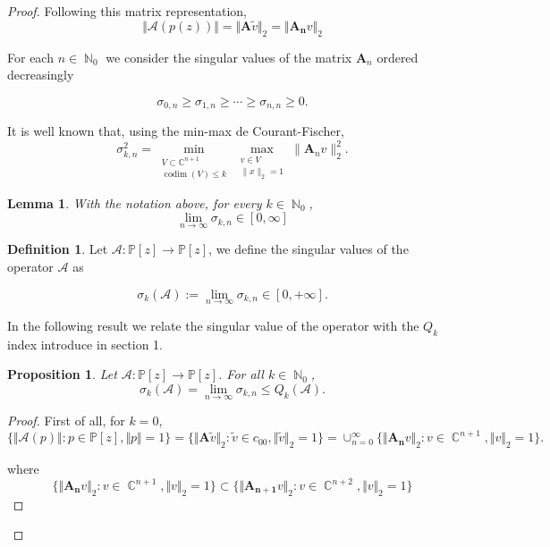 \documentclass[12pt]{amsart}
\theoremstyle{definition}
\newtheorem{definition}{Definition}
\theoremstyle{plain}
\newtheorem{lem}{Lemma}
\newtheorem{prop}{Proposition}
\theoremstyle{remark}
\DeclareMathOperator{\CC}{\mathbb C}
\DeclareMathOperator{\NN}{\mathbb N}
\begin{document}
\begin{proof}
\noindent Following this matrix representation,
$$
\Vert \mathcal{A}(p(z))\Vert =  \Vert \mathbf{A}\tilde{v}\Vert_2= \Vert\mathbf{A_n}v\Vert_2
$$

\noindent 






\noindent For each $n\in \NN_0$ we consider the singular values of the matrix $\mathbf{A}_n$ ordered decreasingly 

\[
		\sigma_{0,n} \geq \sigma_{1,n} \geq \cdots \geq \sigma_{n,n} \geq 0.
	\]

\noindent It is well known that,  using the  min-max de Courant-Fischer,
\medskip 
	\[
		\sigma_{k,n}^2 = \min_{\substack{V \subset \mathbb{C}^{n+1} \\ \operatorname{codim}(V) \leq  k}} \max_{\substack{v \in V \\ \|x\|_2 = 1}} \|\mathbf{A}_n v\|_2^2.
	\]

\begin{lem} With the notation above, for every $k\in \NN_0$, 
$$
\lim_{n\to \infty} \sigma_{k,n
}\in [0,\infty]
$$  
\end{lem}

\medskip
\begin{definition} Let $\mathcal{A}: \mathbb{P}[z] \to  \mathbb{P}[z]$, we define the singular values of the operator  $\mathcal{A}$ as  

	\[
		\sigma_k(\mathcal{A}) := \lim_{n\to\infty} \sigma_{k,n} \in [0,+\infty].
	\]
\end{definition}

\noindent In the following result we relate the singular value of the operator with the $Q_k$ index introduce in section 1. 

\begin{prop} Let $\mathcal{A}: \mathbb{P}[z] \to \mathbb{P}[z]$. For all $k\in \NN_0$,
\medskip 
	\[
	\sigma_k(\mathcal{A})=	\lim_{n\to \infty} \sigma_{k,n} \le Q_k(\mathcal{A}).
	\]
\end{prop}

\begin{proof} First of all, for $k=0$,
$$
\{ \Vert \mathcal{A}(p) \Vert : p\in \mathbb{P}[z], \Vert p \Vert=1\}= \{ \Vert \mathbf{A}\tilde{v}\Vert_2 : \tilde{v}\in c_{00}, \Vert \tilde{v} \Vert_2=1\}= \cup_{n=0}^{\infty} \{ \Vert \mathbf{A_n}v\Vert_2: v\in \CC^{n+1}, \Vert v \Vert_2=1\}.
$$

\noindent where
$$
\{ \Vert \mathbf{A_n}v\Vert_2: v\in \CC^{n+1}, \Vert v \Vert_2=1\} \subset 
\{ \Vert \mathbf{A_{n+1}}v\Vert_2: v\in \CC^{n+2}, \Vert v \Vert_2=1\} 
$$


\end{proof}
\end{proof}
\end{document}
